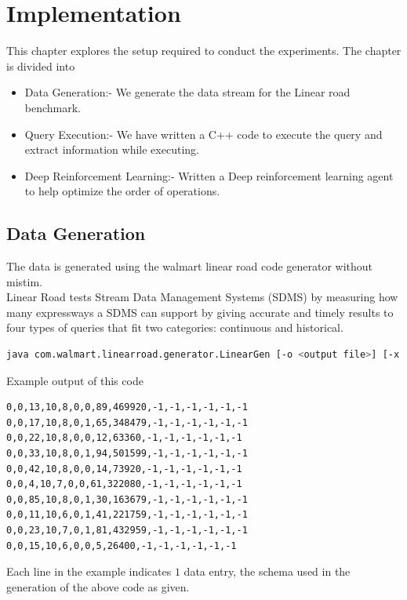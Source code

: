 \chapter{Implementation}
\label{chapter:implementation}
\thispagestyle{myheadings}

\graphicspath{{./4_Implementation/}}
This chapter explores the setup required to conduct the experiments. The chapter is divided into 
\begin{itemize}
\item Data Generation:- We generate the data stream for the Linear road benchmark.
\item Query Execution:- We have written a C++ code to execute the query and extract information while executing.
\item Deep Reinforcement Learning:- Written a Deep reinforcement learning agent to help optimize the order of operations.
\end{itemize}

\section{Data Generation}
The data is generated using the walmart linear road code generator without \\ mistim\cite{walmart_linearoad}.\\
Linear Road tests Stream Data Management Systems (SDMS) by measuring how many expressways a SDMS can support by giving accurate and timely results to four types of queries that fit two categories: continuous and historical.\cite{linearroad_website}
\begin{lstlisting}[language=bash, caption= generate linear road data, label={lst:linear road data generation}]
java com.walmart.linearroad.generator.LinearGen [-o <output file>] [-x <number of xways>] [-m <dummy value to activate multi-threading>]
\end{lstlisting}
Example output of this code
\begin{lstlisting}[caption= linear road data example output]
0,0,13,10,8,0,0,89,469920,-1,-1,-1,-1,-1,-1
0,0,17,10,8,0,1,65,348479,-1,-1,-1,-1,-1,-1
0,0,22,10,8,0,0,12,63360,-1,-1,-1,-1,-1,-1
0,0,33,10,8,0,1,94,501599,-1,-1,-1,-1,-1,-1
0,0,42,10,8,0,0,14,73920,-1,-1,-1,-1,-1,-1
0,0,4,10,7,0,0,61,322080,-1,-1,-1,-1,-1,-1
0,0,85,10,8,0,1,30,163679,-1,-1,-1,-1,-1,-1
0,0,11,10,6,0,1,41,221759,-1,-1,-1,-1,-1,-1
0,0,23,10,7,0,1,81,432959,-1,-1,-1,-1,-1,-1
0,0,15,10,6,0,0,5,26400,-1,-1,-1,-1,-1,-1
\end{lstlisting}
Each line in the example indicates $1$ data entry, the schema used in the generation of the above code as given.
